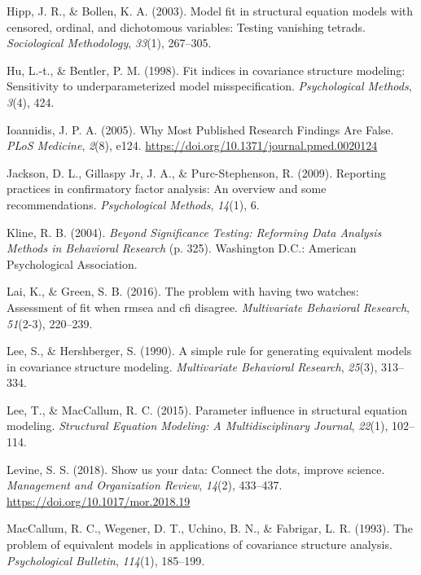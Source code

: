 \documentclass[
  english,
  doc]{apa6}
\newlength{\cslhangindent}
\newenvironment{cslreferences}%
  {\setlength{\parindent}{0pt}%
  \everypar{\setlength{\hangindent}{\cslhangindent}}\ignorespaces}%
  {\par}
\begin{document}
\begin{cslreferences}
\leavevmode\hypertarget{ref-hipp2003model}{}%
Hipp, J. R., \& Bollen, K. A. (2003). Model fit in structural equation models with censored, ordinal, and dichotomous variables: Testing vanishing tetrads. \emph{Sociological Methodology}, \emph{33}(1), 267--305.

\leavevmode\hypertarget{ref-hu1998fit}{}%
Hu, L.-t., \& Bentler, P. M. (1998). Fit indices in covariance structure modeling: Sensitivity to underparameterized model misspecification. \emph{Psychological Methods}, \emph{3}(4), 424.

\leavevmode\hypertarget{ref-Ioannidis2005}{}%
Ioannidis, J. P. A. (2005). Why Most Published Research Findings Are False. \emph{PLoS Medicine}, \emph{2}(8), e124. \url{https://doi.org/10.1371/journal.pmed.0020124}

\leavevmode\hypertarget{ref-jackson2009reporting}{}%
Jackson, D. L., Gillaspy Jr, J. A., \& Purc-Stephenson, R. (2009). Reporting practices in confirmatory factor analysis: An overview and some recommendations. \emph{Psychological Methods}, \emph{14}(1), 6.

\leavevmode\hypertarget{ref-Kline2004}{}%
Kline, R. B. (2004). \emph{Beyond Significance Testing: Reforming Data Analysis Methods in Behavioral Research} (p. 325). Washington D.C.: American Psychological Association.

\leavevmode\hypertarget{ref-lai2016problem}{}%
Lai, K., \& Green, S. B. (2016). The problem with having two watches: Assessment of fit when rmsea and cfi disagree. \emph{Multivariate Behavioral Research}, \emph{51}(2-3), 220--239.

\leavevmode\hypertarget{ref-Lee90}{}%
Lee, S., \& Hershberger, S. (1990). A simple rule for generating equivalent models in covariance structure modeling. \emph{Multivariate Behavioral Research}, \emph{25}(3), 313--334.

\leavevmode\hypertarget{ref-lee2015parameter}{}%
Lee, T., \& MacCallum, R. C. (2015). Parameter influence in structural equation modeling. \emph{Structural Equation Modeling: A Multidisciplinary Journal}, \emph{22}(1), 102--114.

\leavevmode\hypertarget{ref-Levine2018}{}%
Levine, S. S. (2018). Show us your data: Connect the dots, improve science. \emph{Management and Organization Review}, \emph{14}(2), 433--437. \url{https://doi.org/10.1017/mor.2018.19}

\leavevmode\hypertarget{ref-MacCallum93}{}%
MacCallum, R. C., Wegener, D. T., Uchino, B. N., \& Fabrigar, L. R. (1993). The problem of equivalent models in applications of covariance structure analysis. \emph{Psychological Bulletin}, \emph{114}(1), 185--199.


\end{cslreferences}
\end{document}
